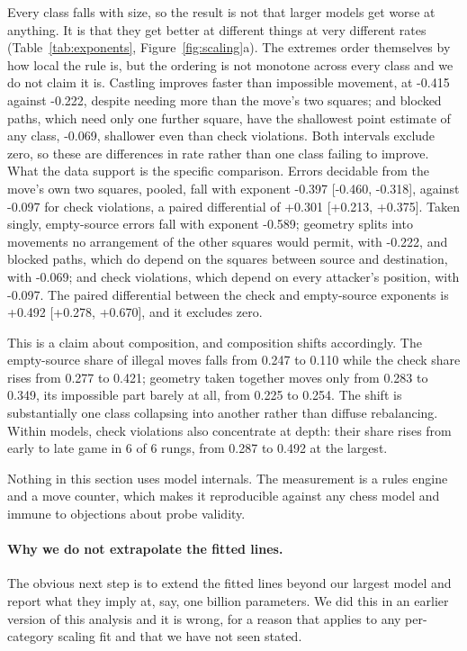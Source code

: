 \documentclass[11pt]{article}
\begin{document}
Every class falls with size, so the result is not that larger models get worse at
anything. It is that they get better at different things at very different rates
(Table~\ref{tab:exponents}, Figure~\ref{fig:scaling}a). The extremes order
themselves by how local the rule is, but the ordering is not monotone across every
class and we do not claim it is. Castling improves faster than impossible movement,
at -0.415 against -0.222, despite needing more than the move's two squares;
and blocked paths, which need only one further square, have the shallowest point
estimate of any class, -0.069, shallower even than check violations. Both
intervals exclude zero, so these are differences in rate rather than one class failing
to improve. What the data support is the specific
comparison. Errors decidable from the move's own two squares, pooled, fall with
exponent -0.397 [-0.460, -0.318], against
-0.097 for check violations, a paired differential of +0.301
[+0.213, +0.375]. Taken singly, empty-source errors fall with exponent
-0.589; geometry splits into movements no arrangement of the other squares
would permit, with -0.222, and blocked paths, which do depend on the squares
between source and destination, with -0.069; and check violations, which
depend on every attacker's position, with -0.097. The paired differential
between the check and empty-source exponents is +0.492
[+0.278, +0.670], and it excludes zero.

This is a claim about composition, and composition shifts accordingly. The
empty-source share of illegal moves falls from 0.247 to
0.110 while the check share rises from 0.277 to
0.421; geometry taken together moves only from 0.283 to
0.349, its impossible part barely at all, from 0.225
to 0.254. The shift is
substantially one class collapsing into another rather than diffuse rebalancing.
Within models, check violations also concentrate at depth: their share rises from
early to late game in 6 of 6 rungs, from
0.287 to 0.492 at the largest.

Nothing in this section uses model internals. The measurement is a rules engine
and a move counter, which makes it reproducible against any chess model and immune
to objections about probe validity.

\paragraph{Why we do not extrapolate the fitted lines.}
The obvious next step is to extend the fitted lines beyond our largest model and
report what they imply at, say, one billion parameters. We did this in an earlier
version of this analysis and it is wrong, for a reason that applies to any
per-category scaling fit and that we have not seen stated.
\end{document}
